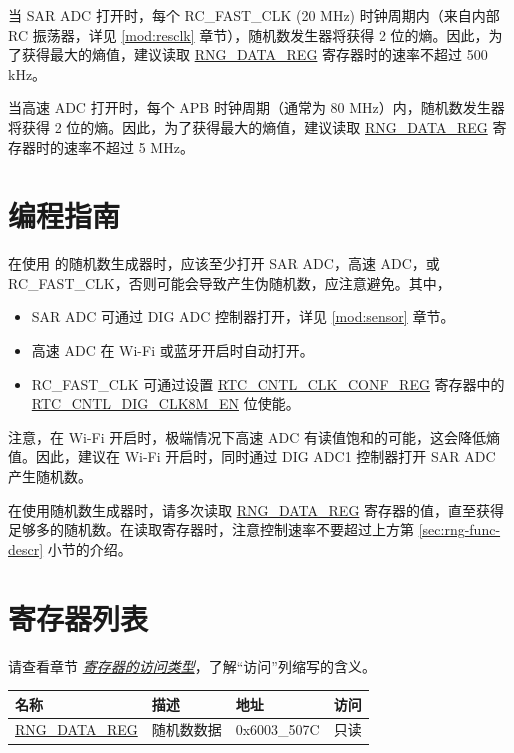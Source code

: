 \documentclass[main\_\_CN.tex]{subfiles}
\begin{document}
当 SAR ADC 打开时，每个 RC\_FAST\_CLK (20 MHz) 时钟周期内（来自内部 RC 振荡器，详见 \ref{mod:resclk} \textit{} 章节），随机数发生器将获得 2 位的熵。因此，为了获得最大的熵值，建议读取 \hyperref[regdesc:RNGDATAREG]{RNG\_DATA\_REG} 寄存器时的速率不超过 500 kHz。

当高速 ADC 打开时，每个 APB 时钟周期（通常为 80 MHz）内，随机数发生器将获得 2 位的熵。因此，为了获得最大的熵值，建议读取 \hyperref[regdesc:RNGDATAREG]{RNG\_DATA\_REG} 寄存器时的速率不超过 5 MHz。



\section{编程指南}

在使用 \chipname{} 的随机数生成器时，应该至少打开 SAR ADC，高速 ADC，或 RC\_FAST\_CLK，否则可能会导致产生伪随机数，应注意避免。其中，
\begin{itemize}
    \item SAR ADC 可通过 DIG ADC 控制器打开，详见 \ref{mod:sensor} \textit{} 章节。
    \item 高速 ADC 在 Wi-Fi 或蓝牙开启时自动打开。
    \item RC\_FAST\_CLK 可通过设置 \hyperref[regdesc:RTCCNTLRTCCLKCONFREG]{RTC\_CNTL\_CLK\_CONF\_REG} 寄存器中的 \hyperref[fielddesc:RTCCNTLDIGCLK8MEN]{RTC\_CNTL\_DIG\_CLK8M\_EN} 位使能。
\end{itemize}

\begin{tiplisting}
注意，在 Wi-Fi 开启时，极端情况下高速 ADC 有读值饱和的可能，这会降低熵值。因此，建议在 Wi-Fi 开启时，同时通过 DIG ADC1 控制器打开 SAR ADC 产生随机数。
\end{tiplisting}

在使用随机数生成器时，请多次读取 \hyperref[regdesc:RNGDATAREG]{RNG\_DATA\_REG} 寄存器的值，直至获得足够多的随机数。在读取寄存器时，注意控制速率不要超过上方第 \ref{sec:rng-func-descr} 小节的介绍。

\section{寄存器列表} \hypertarget{rng-reg-summ}{}

请查看章节 \hyperref[glossary-access-types]{\textit{寄存器的访问类型}}，了解“访问”列缩写的含义。

\begin{table}[H]
    \centering
    \begin{tabular}{ | L{3cm} | L{2.5cm} | C{2.5cm} | C{1cm} |  }
    \hline
    \textbf{名称} & \textbf{描述} & \textbf{地址} & \textbf{访问} \\
    \hline
    \hyperref[regdesc:RNGDATAREG]{RNG\_DATA\_REG} & 随机数数据 & 0x6003\_507C & 只读 \\
    \hline
    \end{tabular}
\end{table}
\end{document}
